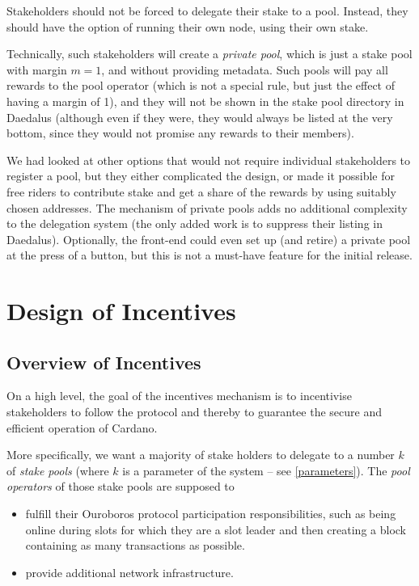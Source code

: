 \documentclass[11pt,a4paper]{article}
\begin{document}
Stakeholders should not be forced to delegate their stake to a
pool. Instead, they should have the option of running their own node,
using their own stake.

Technically, such stakeholders will create a \emph{private pool}, which is just
a stake pool with margin \(m=1\), and without providing metadata. Such pools
will pay all rewards to the pool operator (which is not a special rule, but just
the effect of having a margin of 1), and they will not be shown in the stake
pool directory in Daedalus (although even if they were, they would always be
listed at the very bottom, since they would not promise any rewards to their
members).

We had looked at other options that would not require individual
stakeholders to register a pool, but they either complicated the
design, or made it possible for free riders to contribute stake and
get a share of the rewards by using suitably chosen addresses. The
mechanism of private pools adds no additional complexity to the
delegation system (the only added work is to suppress their listing in
Daedalus). Optionally, the front-end could even set up (and retire) a
private pool at the press of a button, but this is not a must-have
feature for the initial release.

\section{Design of Incentives}
\label{design-of-incentives}

\subsection{Overview of Incentives}
\label{overview-of-incentives}

On a high level, the goal of the incentives mechanism is to incentivise
stakeholders to follow the protocol and thereby to guarantee the secure and
efficient operation of Cardano.

More specifically, we want a majority of stake holders to
delegate to a number \(k\) of \emph{stake pools} (where \(k\) is a
parameter of the system -- see \cref{parameters}). The
\emph{pool operators} of those stake pools are supposed to

\begin{itemize}
\item
  fulfill their Ouroboros protocol participation responsibilities,
  such as being online during slots for which they are a slot leader and
  then creating a block containing as many transactions as possible.
\item
  provide additional network infrastructure.
\end{itemize}
\end{document}
